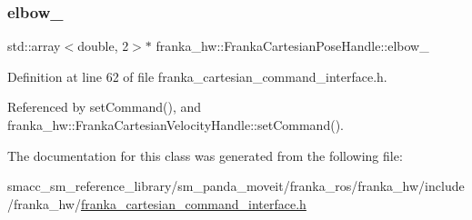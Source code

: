 \subsubsection{\texorpdfstring{elbow\+\_\+}{elbow\_}}
{\footnotesize\ttfamily std\+::array$<$double, 2$>$$\ast$ franka\+\_\+hw\+::\+Franka\+Cartesian\+Pose\+Handle\+::elbow\+\_\+\hspace{0.3cm}{\ttfamily [private]}}



Definition at line 62 of file franka\+\_\+cartesian\+\_\+command\+\_\+interface.\+h.



Referenced by set\+Command(), and franka\+\_\+hw\+::\+Franka\+Cartesian\+Velocity\+Handle\+::set\+Command().



The documentation for this class was generated from the following file\+:\begin{DoxyCompactItemize}
\item 
smacc\+\_\+sm\+\_\+reference\+\_\+library/sm\+\_\+panda\+\_\+moveit/franka\+\_\+ros/franka\+\_\+hw/include/franka\+\_\+hw/\hyperlink{franka__cartesian__command__interface_8h}{franka\+\_\+cartesian\+\_\+command\+\_\+interface.\+h}\end{DoxyCompactItemize}
